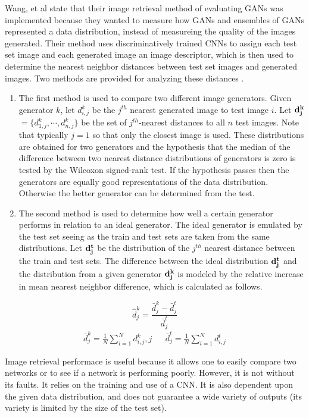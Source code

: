 Wang, et al \cite{wang2016ensembles} state that their image retrieval method of evaluating GANs was implemented because they wanted to measure how GANs and ensembles of GANs represented a data distribution, instead of measureing the quality of the images generated.
Their method uses discriminatively trained CNNs to assign each test set image and each generated image an image descriptor, which is then used to determine the nearest neighbor distances between test set images and generated images.  Two methods are provided for analyzing these distances \cite{wang2016ensembles}\cite{borji2018pros}.
\begin{enumerate}
  \item The first method is used to compare two different image generators. Given generator $k$, let $d_{i,j}^k$ be the $j^{th}$ nearest generated image to test image $i$.
  Let $\bf{d}_j^k$ $= \{d_{1,j}^k,\cdots,d_{n,j}^k\}$ be the set of $j^{th}$-nearest distances to all $n$ test images.
  Note that typically $j=1$ so that only the closest image is used. These distributions are obtained for two generators and the hypothesis that the median of the difference between two nearest distance distributions of generators is zero is tested by the Wilcoxon signed-rank test.
  If the hypothesis passes then the generators are equally good representations of the data distribution.
  Otherwise the better generator can be determined from the test.
  \item The second method is used to determine how well a certain generator performs in relation to an ideal generator. The ideal generator is emulated by the test set seeing as the train and test sets are taken from the same distributions.
   Let $\bf{d}_j^t$ be the distribution of the $j^{th}$ nearest distance between the train and test sets.
   The difference between the ideal distribution $\bf{d}_j^t$ and the distribution from a given generator $\bf{d}_j^k$ is modeled by the relative increase in mean nearest neighbor difference, which is calculated as follows.
\end{enumerate}


\begin{equation}
  \hat{d}_j^k = \frac{\bar{d}_j^k - \bar{d}_j^t}{\bar{d}_j^t}
\end{equation}
\begin{align*}
  \bar{d}_j^k = \frac{1}{N}\sum_{i=1}^Nd_{i,j}^k,j
  &&
  \bar{d}_j^t=\frac{1}{N}\sum_{i=1}^{N}d_{i,j}^t
\end{align*}

Image retrieval performace is useful because it allows one to easily compare two networks or to see if a network is performing poorly.
However, it is not without its faults. It relies on the training and use of a CNN.
It is also dependent upon the given data distribution, and does not guarantee a wide variety of outputs (its variety is limited by the size of the test set).
